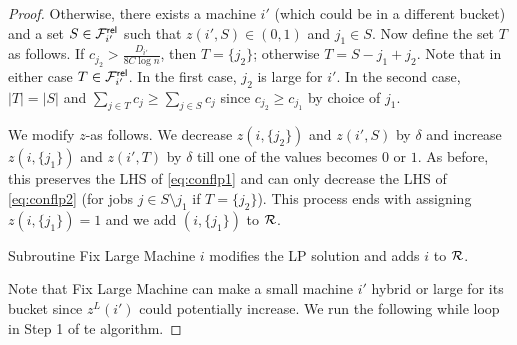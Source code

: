 \begin{proof}
	Otherwise, there exists a machine $i'$ (which could be in a different bucket) and a set $S\in {\cal F}^{\mathsf{rel}}_{i'}$ such that $z(i',S) \in (0,1)$ and $j_1 \in S$. 
	Now define the set $T$ as follows. If $c_{j_2} > \frac{D_{i'}}{8C\log n}$, then $T = \{j_2\}$; otherwise $T = S - j_1 + j_2$. Note that in either case $T \in {\cal F}^{\mathsf{rel}}_{i'}$.
	In the first case, $j_2$ is large for $i'$. In the second case, $|T| = |S|$ and $\sum_{j\in T} c_j \ge \sum_{j\in S} c_j$ since $c_{j_2} \geq c_{j_1}$ by choice of $j_1$.
	
	We modify $z$-as follows. We decrease $z(i,\{j_2\})$ and $z(i',S)$ by $\delta$ and increase $z(i,\{j_1\})$ and $z(i',T)$ by $\delta$ till one of the values becomes $0$ or $1$. 
	As before, this preserves the LHS of \eqref{eq:conflp1} and can only decrease the LHS of \eqref{eq:conflp2} (for jobs $j\in S\setminus j_1$ if $T = \{j_2\}$).
   This process ends with assigning $z(i,\{j_1\}) = 1$ and we add $(i,\{j_1\})$ to ${\cal R}$.
   
   \begin{claim}\label{clm:002}
Subroutine Fix Large  Machine $i$ modifies the LP solution and adds $i$ to ${\cal R}$. 
   	\end{claim}
   \noindent
   Note that Fix Large Machine can make a small machine $i'$ hybrid or large for its bucket since $z^L(i')$ could potentially increase.  
   We run the following while loop in Step 1 of te algorithm.
   

\end{proof}
